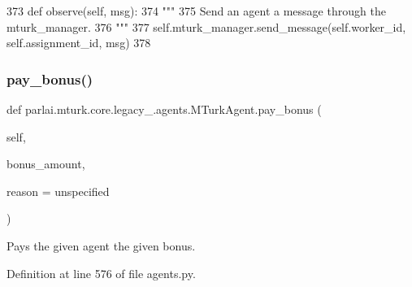 \begin{DoxyCode}
373     \textcolor{keyword}{def }observe(self, msg):
374         \textcolor{stringliteral}{"""}
375 \textcolor{stringliteral}{        Send an agent a message through the mturk\_manager.}
376 \textcolor{stringliteral}{        """}
377         self.mturk\_manager.send\_message(self.worker\_id, self.assignment\_id, msg)
378 
\end{DoxyCode}
\mbox{\label{classparlai_1_1mturk_1_1core_1_1legacy__2018_1_1agents_1_1MTurkAgent_ad5cc68dcd472181264b97cae8bb0f63e}} 
\subsubsection{\texorpdfstring{pay\+\_\+bonus()}{pay\_bonus()}}
{\footnotesize\ttfamily def parlai.\+mturk.\+core.\+legacy\+\_.\+agents.\+M\+Turk\+Agent.\+pay\+\_\+bonus (\begin{DoxyParamCaption}\item[{}]{self,  }\item[{}]{bonus\+\_\+amount,  }\item[{}]{reason = {\ttfamily \textquotesingle{}unspecified\textquotesingle{}} }\end{DoxyParamCaption})}

\begin{DoxyVerb}Pays the given agent the given bonus.
\end{DoxyVerb}
 

Definition at line 576 of file agents.\+py.


